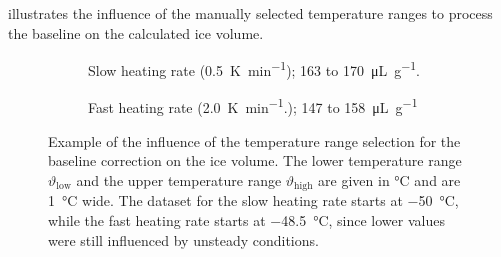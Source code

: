  illustrates the influence of the manually selected temperature ranges to process the baseline on the calculated ice volume.

\begin{figure}[!htb]
    \centering
	\begin{subfigure}{.495\textwidth}

	  \caption{
		Slow heating rate (\qty{0.5}{\kelvin\per\minute}); \num{163} to \qty{170}{\micro\liter\per\gram}.
	  }

	\end{subfigure}
	\hfill
	\begin{subfigure}{.495\textwidth}

	  \caption{Fast heating rate (\qty{2.0}{\kelvin\per\minute}.); \num{147} to \qty{158}{\micro\liter\per\gram}}

	\end{subfigure}

    \caption{
		Example of the influence of the temperature range selection for the baseline correction on the ice volume.
		The lower temperature range $\vartheta_\text{low}$ and the upper temperature range $\vartheta_\text{high}$ are given in \unit{\celsius} and are \qty{1}{\celsius} wide.
		The dataset for the slow heating rate starts at \qty{-50}{\celsius}, while the fast heating rate starts at \qty{-48.5}{\celsius}, since lower values were still influenced by unsteady conditions.
	}
    \label{fig:basle_line_ice_vol}
\end{figure}



